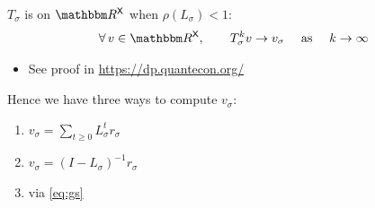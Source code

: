 \documentclass[xcolor=tex,dvipsnames]{beamer}
\begin{document}
\begin{frame}
    
    \Fact $T_\sigma$ is  on $\RR^\Xsf$ when $\rho(L_\sigma) <
    1$:
    \begin{equation}\label{eq:gs}
        \forall  \, v \in \RR^\Xsf,
        \qquad
        T_\sigma^k v \to v_\sigma
        \quad \text{ as } \quad k \to \infty
    \end{equation}

    \begin{itemize}
        \item See proof in \url{https://dp.quantecon.org/}
    \end{itemize}
    \vspace{0.4em}
    \vspace{0.4em}
    \vspace{0.4em}
    Hence we have three ways to compute $v_\sigma$:

    \vspace{0.4em}
    \vspace{0.4em}
    \begin{enumerate}
        \item $ v_\sigma = \sum_{t \geq 0} L_\sigma^t r_\sigma$
    \vspace{0.4em}
        \item  $v_\sigma = (I - L_\sigma)^{-1} r_\sigma$
    \vspace{0.4em}
        \item via \eqref{eq:gs}
    \end{enumerate}

\end{frame}
\end{document}
